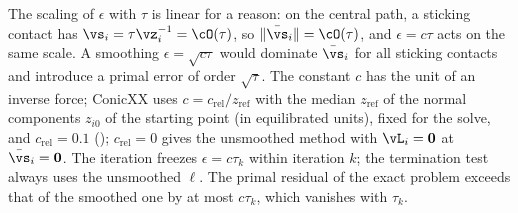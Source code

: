 %
The scaling of $\epsilon$ with $\tau$ is linear for a reason: on the central path, a sticking contact has $\vs_i = \tau\vz_i^{-1} = \cO(\tau)$, so $\|\bar{\vs}_i\| = \cO(\tau)$, and $\epsilon = c\tau$ acts on the same scale. A smoothing $\epsilon = \sqrt{c\tau}$ would dominate $\bar{\vs}_i$ for all sticking contacts and introduce a primal error of order $\sqrt{\tau}$. The constant $c$ has the unit of an inverse force; ConicXX uses $c = c_{\mathrm{rel}}/z_{\mathrm{ref}}$ with the median $z_{\mathrm{ref}}$ of the normal components $z_{i0}$ of the starting point (in equilibrated units), fixed for the solve, and $c_{\mathrm{rel}} = 0.1$ (); $c_{\mathrm{rel}} = 0$ gives the unsmoothed method with $\vL_i = \mathbf{0}$ at $\bar{\vs}_i = \mathbf{0}$. The iteration freezes $\epsilon = c\tau_k$ within iteration $k$; the termination test always uses the unsmoothed $\ell$. The primal residual of the exact problem exceeds that of the smoothed one by at most $c\tau_k$, which vanishes with $\tau_k$.
%
